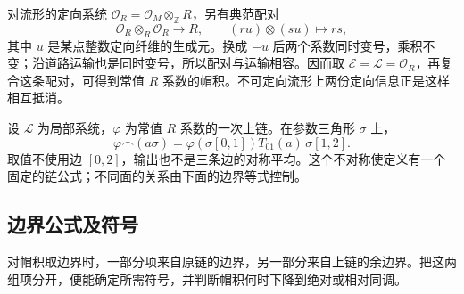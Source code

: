 \ProseParagraphBreak

对流形的定向系统 \(\mathcal O_R=\mathcal O_M\otimes_{\mathbb Z}R\)，另有典范配对
\begin{equation}\label{g2:eq:orientation-tensor-pairing}
	\mathcal O_R\otimes_R\mathcal O_R\longrightarrow R,
	\qquad (ru)\otimes(su)\longmapsto rs,
\end{equation}
其中 \(u\) 是某点整数定向纤维的生成元。换成 \(-u\) 后两个系数同时变号，乘积不变；沿道路运输也是同时变号，所以配对与运输相容。因而取 \(\mathcal E=\mathcal L=\mathcal O_R\)，再复合这条配对，可得到常值 \(R\) 系数的帽积。不可定向流形上两份定向信息正是这样相互抵消。

\begin{example}\label{g2:exm:cap-triangle}
	设 \(\mathcal L\) 为局部系统，\(\varphi\) 为常值 \(R\) 系数的一次上链。在参数三角形 \(\sigma\) 上，
	\[
		\varphi\frown(a\sigma)=\varphi(\sigma[0,1])T_{01}(a)\,\sigma[1,2].
	\]
	取值不使用边 \([0,2]\)，输出也不是三条边的对称平均。这个不对称使定义有一个固定的链公式；不同面的关系由下面的边界等式控制。
\end{example}

\subsection{边界公式及符号}
\label{g2:subsec:0602:02}
对帽积取边界时，一部分项来自原链的边界，另一部分来自上链的余边界。把这两组项分开，便能确定所需符号，并判断帽积何时下降到绝对或相对同调。

